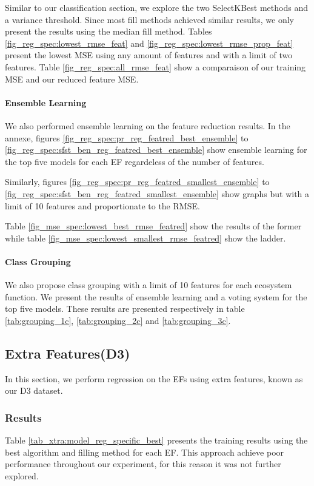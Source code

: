 \documentclass[12pt,letterpaper]{article}
\begin{document}
Similar to our classification section, we explore the two SelectKBest methods and a variance threshold.
Since most fill methods achieved similar results, we only present the results using the median fill method.
Tables \ref{fig_reg_spec:lowest_rmse_feat} and \ref{fig_reg_spec:lowest_rmse_prop_feat} present the lowest MSE using any amount of features and with a limit of two features.
Table \ref{fig_reg_spec:all_rmse_feat} show a comparaison of our training MSE and our reduced feature MSE.


\paragraph{Ensemble Learning}
We also performed ensemble learning on the feature reduction results.
In the annexe, figures \ref{fig_reg_spec:pr_reg_featred_best_ensemble} to \ref{fig_reg_spec:sfst_ben_reg_featred_best_ensemble} show ensemble learning for the top five models for each \ac{EF} regardeless of the number of features.


Similarly, figures \ref{fig_reg_spec:pr_reg_featred_smallest_ensemble} to \ref{fig_reg_spec:sfst_ben_reg_featred_smallest_ensemble} show graphs but with a limit of 10 features and proportionate to the RMSE.


Table \ref{fig_mse_spec:lowest_best_rmse_featred} show the results of the former while table \ref{fig_mse_spec:lowest_smallest_rmse_featred} show the ladder.


\paragraph{Class Grouping}
We also propose class grouping with a limit of 10 features for each ecosystem function.
We present the results of ensemble learning and a voting system for the top five models.
These results are presented respectively in table \ref{tab:grouping_1c}, \ref{tab:grouping_2c} and \ref{tab:grouping_3c}.




\subsection{Extra Features(D3)}
In this section, we perform regression on the EFs using extra features, known as our D3 dataset.

\subsubsection{Results}
Table \ref{tab_xtra:model_reg_specific_best} presents the training results using the best algorithm and filling method for each EF.
This approach achieve poor performance throughout our experiment, for this reason it was not further explored.
\end{document}
